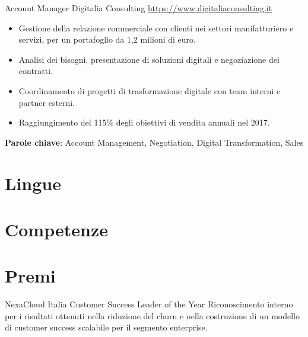 \documentclass[a4paper, serif, 10pt]{moderncv}
\begin{document}
        {Account Manager}
        {Digitalia Consulting}
        {\url{https://www.digitaliaconsulting.it}}
        {}
        {\begin{itemize}
\item Gestione della relazione commerciale con clienti nei settori manifatturiero e servizi, per un portafoglio da 1,2 milioni di euro.
\item Analisi dei bisogni, presentazione di soluzioni digitali e negoziazione dei contratti.
\item Coordinamento di progetti di trasformazione digitale con team interni e partner esterni.
\item Raggiungimento del 115\% degli obiettivi di vendita annuali nel 2017.
\end{itemize}
\textbf{Parole chiave}: Account Management, Negotiation, Digital Transformation, Sales}
\section{Lingue}

\section{Competenze}

\section{Premi}

        {NexaCloud Italia}
        {Customer Success Leader of the Year}
        {}
        {}
        {Riconoscimento interno per i risultati ottenuti nella riduzione del churn e nella costruzione di un modello di customer success scalabile per il segmento enterprise.}
\end{document}
